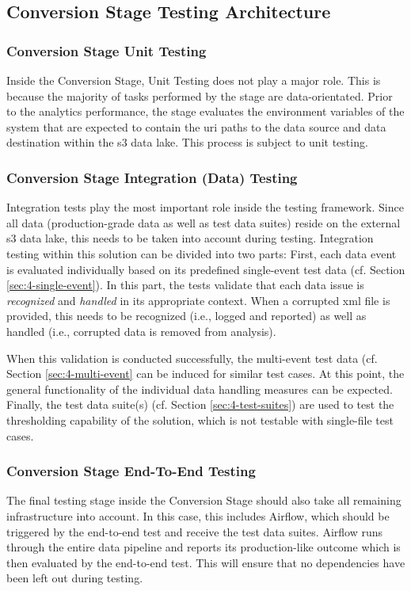 \subsection{Conversion Stage Testing Architecture}
\subsubsection{Conversion Stage Unit Testing}
Inside the Conversion Stage, Unit Testing does not play a major role. This is because the majority of tasks performed by the stage are data-orientated. Prior to the analytics performance, the stage evaluates the environment variables of the system that are expected to contain the \ac{uri} paths to the data source and data destination within the \ac{s3} data lake. This process is subject to unit testing.

\subsubsection{Conversion Stage Integration (Data) Testing}
Integration tests play the most important role inside the testing framework. Since all data (production-grade data as well as test data suites) reside on the external \ac{s3} data lake, this needs to be taken into account during testing. Integration testing within this solution can be divided into two parts: First, each data event is evaluated individually based on its predefined single-event test data (cf. Section \ref{sec:4-single-event}). In this part, the tests validate that each data issue is \textit{recognized} and \textit{handled} in its appropriate context. When a corrupted \ac{xml} file is provided, this needs to be recognized (i.e., logged and reported) as well as handled (i.e., corrupted data is removed from analysis).

When this validation is conducted successfully, the multi-event test data (cf. Section \ref{sec:4-multi-event} can be induced for similar test cases. At this point, the general functionality of the individual data handling measures can be expected. Finally, the test data suite(s) (cf. Section \ref{sec:4-test-suites}) are used to test the thresholding capability of the solution, which is not testable with single-file test cases.

\subsubsection{Conversion Stage End-To-End Testing}
The final testing stage inside the Conversion Stage should also take all remaining infrastructure into account. In this case, this includes Airflow, which should be triggered by the end-to-end test and receive the test data suites. Airflow runs through the entire data pipeline and reports its production-like outcome which is then evaluated by the end-to-end test. This will ensure that no dependencies have been left out during testing.

